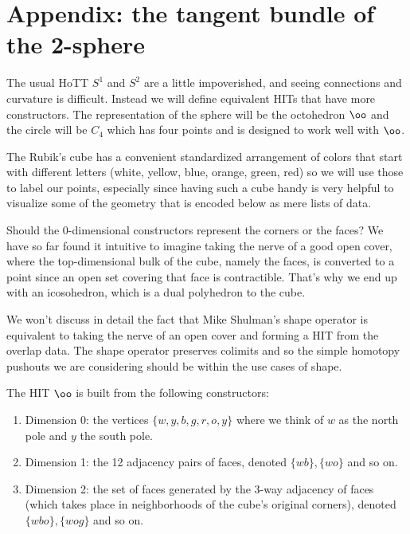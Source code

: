 \section{Appendix: the tangent bundle of the
2-sphere}\label{appendix-the-tangent-bundle-of-the-2-sphere}

The usual HoTT \(S^1\) and \(S^2\) are a little impoverished, and seeing
connections and curvature is difficult. Instead we will define
equivalent HITs that have more constructors. The representation of the
sphere will be the octohedron \(\oo\) and the circle will be \(C_4\)
which has four points and is designed to work well with \(\oo\).

The Rubik's cube has a convenient standardized arrangement of colors
that start with different letters (white, yellow, blue, orange, green,
red) so we will use those to label our points, especially since having
such a cube handy is very helpful to visualize some of the geometry that
is encoded below as mere lists of data.

Should the 0-dimensional constructors represent the corners or the
faces? We have so far found it intuitive to imagine taking the nerve of
a good open cover, where the top-dimensional bulk of the cube, namely
the faces, is converted to a point since an open set covering that face
is contractible. That's why we end up with an icosohedron, which is a
dual polyhedron to the cube.

We won't discuss in detail the fact that Mike Shulman's shape operator
\cite{shulman_cohesion} is equivalent to taking the nerve of an open
cover and forming a HIT from the overlap data. The shape operator
preserves colimits and so the simple homotopy pushouts we are
considering should be within the use cases of shape.

The HIT \(\oo\) is built from the following constructors:

\begin{enumerate}
\item
  Dimension 0: the vertices \(\{w, y, b, g, r, o, y\}\) where we think
  of \(w\) as the north pole and \(y\) the south pole.
\item
  Dimension 1: the 12 adjacency pairs of faces, denoted
  \(\{wb\}, \{wo\}\) and so on.
\item
  Dimension 2: the set of faces generated by the 3-way adjacency of
  faces (which takes place in neighborhoods of the cube's original
  corners), denoted \(\{wbo\}, \{wog\}\) and so on.
\end{enumerate}

